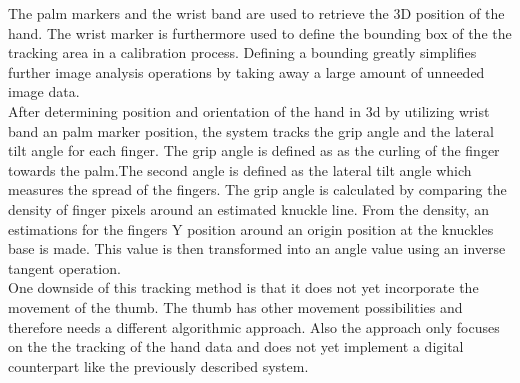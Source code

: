 The palm markers and the wrist band are used to retrieve the 3D position of the hand. The wrist marker is furthermore used to define the bounding box of the the tracking area in a calibration process. Defining a bounding greatly simplifies further image analysis operations by taking away a large amount of unneeded image data.\\
After determining position and orientation of the hand in 3d by utilizing wrist band an palm marker position, the system tracks the grip angle and the lateral tilt angle for each finger. The grip angle is defined as as the curling of the finger towards the palm.The second angle is defined as the lateral tilt angle which measures the spread of the fingers.
The grip angle is calculated by comparing the density of finger pixels around an estimated knuckle line. From the density, an estimations for the fingers Y position around an origin position at the knuckles base is made. This value is then transformed into an angle value using an inverse tangent operation.\\
One downside of this tracking method is that it does not yet incorporate the movement of the thumb. The thumb has other movement possibilities and therefore needs a different algorithmic approach. Also the approach only focuses on the the tracking of the hand data and does not yet implement a digital counterpart like the previously described system.
